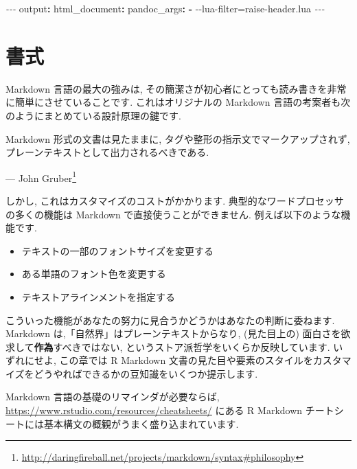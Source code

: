 \documentclass[
  11pt,
]{bxjsreport}
\newenvironment{Shaded}{\begin{snugshade}}{\end{snugshade}}
\newcommand{\AttributeTok}[1]{\textcolor[rgb]{0.77,0.63,0.00}{#1}}
\newcommand{\FunctionTok}[1]{\textcolor[rgb]{0.00,0.00,0.00}{#1}}
\newcommand{\KeywordTok}[1]{\textcolor[rgb]{0.13,0.29,0.53}{\textbf{#1}}}
\newcommand{\PreprocessorTok}[1]{\textcolor[rgb]{0.56,0.35,0.01}{\textit{#1}}}
\renewenvironment{quote}{\begin{VF}}{\end{VF}}
\renewcommand{\href}[2]{#2\footnote{\url{#1}}}
\renewenvironment{quote}{\def\FrameCommand{{\color{quotebarcolor}{\vrule width 3pt}}\hspace{10pt}}\MakeFramed{\advance\hsize-\width\FrameRestore}}{\endMakeFramed}
\begin{document}
\begin{Shaded}
\begin{Highlighting}[]
\PreprocessorTok{{-}{-}{-}}
\FunctionTok{output}\KeywordTok{:}
\AttributeTok{  }\FunctionTok{html\_document}\KeywordTok{:}
\AttributeTok{    }\FunctionTok{pandoc\_args}\KeywordTok{:}
\AttributeTok{      }\KeywordTok{{-}}\AttributeTok{ {-}{-}lua{-}filter=raise{-}header.lua}
\PreprocessorTok{{-}{-}{-}}
\end{Highlighting}
\end{Shaded}

\hypertarget{formatting}{%
\chapter{書式}\label{formatting}}

Markdown 言語の最大の強みは, その簡潔さが初心者にとっても読み書きを非常に簡単にさせていることです. これはオリジナルの Markdown 言語の考案者も次のようにまとめている設計原理の鍵です.

\begin{quote}
Markdown 形式の文書は見たままに, タグや整形の指示文でマークアップされず, プレーンテキストとして出力されるべきである.

\begin{flushright}
--- \href{http://daringfireball.net/projects/markdown/syntax\#philosophy}{John Gruber}

\end{flushright}
\end{quote}

しかし, これはカスタマイズのコストがかかります. 典型的なワードプロセッサの多くの機能は Markdown で直接使うことができません. 例えば以下のような機能です.

\begin{itemize}
\item
  テキストの一部のフォントサイズを変更する
\item
  ある単語のフォント色を変更する
\item
  テキストアラインメントを指定する
\end{itemize}

こういった機能があなたの努力に見合うかどうかはあなたの判断に委ねます. Markdown は,「自然界」はプレーンテキストからなり, (見た目上の) 面白さを欲求して\textbf{作為}すべきではない, というストア派哲学をいくらか反映しています. いずれにせよ, この章では R Markdown 文書の見た目や要素のスタイルをカスタマイズをどうやればできるかの豆知識をいくつか提示します.

Markdown 言語の基礎のリマインダが必要ならば, \url{https://www.rstudio.com/resources/cheatsheets/} にある R Markdown チートシートには基本構文の概観がうまく盛り込まれています.
\end{document}
